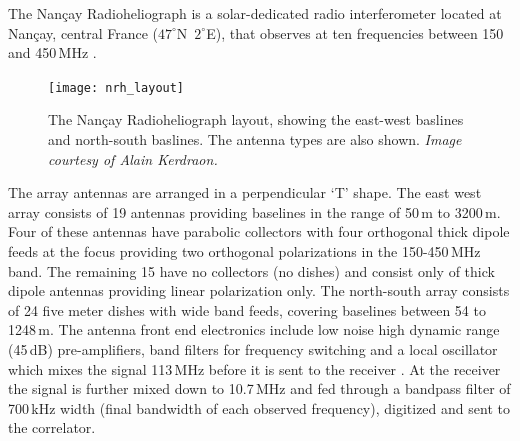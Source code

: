 The Nan\c{c}ay Radioheliograph is a solar-dedicated radio interferometer located at Nan\c{c}ay, central France ($47^{\circ}$N~$2^{\circ}$E), that observes at ten frequencies between 150 and 450\,MHz \citep{kerdraon1997}.
\begin{figure}
\centering
\texttt{[image: nrh\_layout]}
\caption[The Nan\c{c}ay Radioheliograph layout]{The Nan\c{c}ay Radioheliograph layout, showing the east-west baslines and north-south baslines. The antenna types are also shown. {\it Image courtesy of Alain Kerdraon.}}
\label{fig:eclipse}
\end{figure}
The array antennas are arranged in a perpendicular \textquoteleft T' shape. The east west array consists of 19 antennas providing baselines in the range of 50\,m to 3200\,m. Four of these antennas have parabolic collectors with four orthogonal thick dipole feeds at the focus providing two orthogonal polarizations in the 150-450\,MHz band. The remaining 15 have no collectors (no dishes) and consist only of thick dipole antennas providing linear polarization only. The north-south array consists of 24 five meter dishes with wide band feeds, covering baselines between 54 to 1248\,m. The antenna front end electronics include low noise high dynamic range (45\,dB) pre-amplifiers, band filters for frequency switching and a local oscillator which mixes the signal 113\,MHz before it is sent to the receiver \citep{avignon1989}. At the receiver the signal is further mixed down to 10.7\,MHz and fed through a bandpass filter of 700\,kHz width (final bandwidth of each observed frequency), digitized and sent to the correlator.



